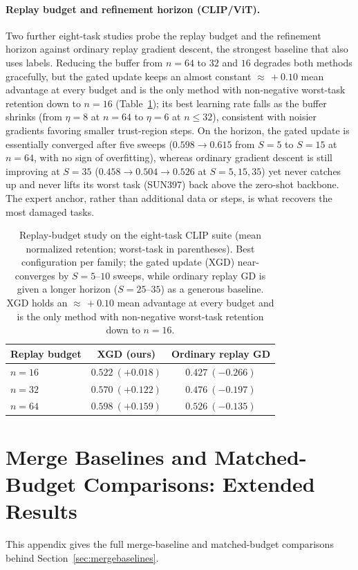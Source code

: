 \documentclass{article} %
\begin{document}
\paragraph{Replay budget and refinement horizon (CLIP/ViT).}
Two further eight-task studies probe the replay budget and the refinement horizon against ordinary replay gradient descent, the strongest baseline that also uses labels. Reducing the buffer from $n=64$ to $32$ and $16$ degrades both methods gracefully, but the gated update keeps an almost constant ${\approx}\,+0.10$ mean advantage at every budget and is the only method with non-negative worst-task retention down to $n=16$ (Table~\ref{tab:clipbudget}); its best learning rate falls as the buffer shrinks (from $\eta=8$ at $n=64$ to $\eta=6$ at $n\le 32$), consistent with noisier gradients favoring smaller trust-region steps. On the horizon, the gated update is essentially converged after five sweeps ($0.598\to0.615$ from $S=5$ to $S=15$ at $n=64$, with no sign of overfitting), whereas ordinary gradient descent is still improving at $S=35$ ($0.458\to0.504\to0.526$ at $S=5,15,35$) yet never catches up and never lifts its worst task (SUN397) back above the zero-shot backbone. The expert anchor, rather than additional data or steps, is what recovers the most damaged tasks.

\begin{table}[t]
\centering
\caption{Replay-budget study on the eight-task CLIP suite (mean normalized retention; worst-task in parentheses). Best configuration per family; the gated update (XGD) near-converges by $S=5\text{--}10$ sweeps, while ordinary replay GD is given a longer horizon ($S=25\text{--}35$) as a generous baseline. XGD holds an ${\approx}\,+0.10$ mean advantage at every budget and is the only method with non-negative worst-task retention down to $n=16$.}
\label{tab:clipbudget}
\begin{tabular}{lcc}
\toprule
Replay budget & \textbf{XGD (ours)} & Ordinary replay GD \\
\midrule
$n=16$ & $\mathbf{0.522}\ (\mathbf{+0.018})$ & $0.427\ (-0.266)$ \\
$n=32$ & $\mathbf{0.570}\ (\mathbf{+0.122})$ & $0.476\ (-0.197)$ \\
$n=64$ & $\mathbf{0.598}\ (\mathbf{+0.159})$ & $0.526\ (-0.135)$ \\
\bottomrule
\end{tabular}
\end{table}

\section{Merge Baselines and Matched-Budget Comparisons: Extended Results}
\label{app:mergebaselines}
This appendix gives the full merge-baseline and matched-budget comparisons behind Section~\ref{sec:mergebaselines}.
\end{document}
